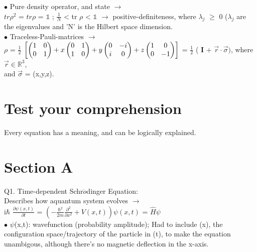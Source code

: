 \documentclass[10pt,fancy]{elegantbook}
\begin{document}
{$\bullet$ Pure density operator, and state $\longrightarrow$ \\
$tr \rho^2$ = $tr \rho$ = $\mathbb 1$ ; $\frac{1}{N}$ < tr $\rho$ < $\mathbb 1$ $\rightarrow$ positive-definiteness, where $\lambda_j$ $\geq$ 0 ($\lambda_j$ are the eigenvalues and 'N' is the Hilbert space dimension. \\

$\bullet$ Traceless-Pauli-matrices $\longrightarrow$  \\

$\rho$ = $\frac{1}{2}$ $\left[ \begin{pmatrix}1 & 0 \cr 0 & 1 \end{pmatrix} + x \begin{pmatrix}0 & 1 \cr 1 & 0 \end{pmatrix} + y \begin{pmatrix}0 & -i \cr i & 0  \\ \end{pmatrix} + z \begin{pmatrix}1 & 0 \cr 0 & -1 \end{pmatrix} \right]$  = $\frac{1}{2}$ ( $\mathbf{I}$ + $\vec{r} \cdot \vec{\sigma})$, where $\vec{r} \in \mathbb R^3$,\\ and $\vec{\sigma}$ = (x,y,z). \\

\section{Test your comprehension}

Every equation has a meaning, and can be logically explained.

\section{Section A}

Q1. Time-dependent Schr$\ddot{o}$dinger Equation: \\
  
Describes how aquantum system evolves $\longrightarrow$ \\

i$\hbar$ $\frac{\partial \psi(x,t)}{\partial t}$ = $\left( -\frac{\hbar^2}{2m} \frac{ \partial^2}{ \partial x^2} + V(x,t) \right) \psi(x,t)$ = $\hat {H} \psi$ \\
   
$\bullet$ $\psi$(x,t): wavefunction (probability amplitude); Had to include (x), the configuration space/trajectory of the particle in (t), to make the equation unambigous, although there's no magnetic deflection in the x-axis.\\

}
\end{document}
